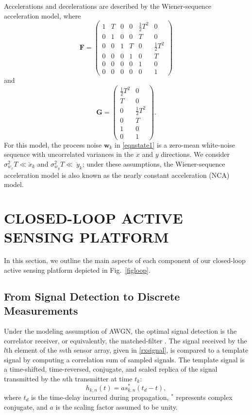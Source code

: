 \documentclass[times]{asjcauth}
\begin{document}
Accelerations and decelerations are described by the Wiener-sequence acceleration model, where
\begin{equation*}
\mathbf{F} = \left(%
\begin{array}{cccccc}
  1 & T & 0 & 0 & \frac{1}{2}T^{2} & 0\\
  0 & 1 & 0 & 0 & T & 0\\
  0 & 0 & 1 & T & 0 & \frac{1}{2}T^{2}\\
  0 & 0 & 0 & 1 & 0 & T\\
  0 & 0 & 0 & 0 & 1 & 0\\
  0 & 0 & 0 & 0 & 0 & 1
\end{array}%
\right)
\end{equation*}
\noindent and
\begin{equation*}
\mathbf{G} = \left(%
\begin{array}{cc}
  \frac{1}{2}T^{2} & 0\\
  T & 0\\
  0 & \frac{1}{2}T^{2}\\
  0 & T\\
  1 & 0\\
  0 & 1
\end{array}%
\right).
\end{equation*}
\noindent For this model, the process noise $\mathbf{w}_{k}$ in \eqref{eqnstate1} is a zero-mean white-noise sequence with uncorrelated variances in the $x$ and $y$ directions. We consider $\sigma^{2}_{w_{x}}T \ll \ddot{x}_{k}$ and $\sigma^{2}_{w_{y}}T \ll~\ddot{y}_{k}$; under these assumptions, the Wiener-sequence acceleration model is also known as the nearly constant acceleration (NCA) model.

\section{CLOSED-LOOP ACTIVE SENSING PLATFORM}
\label{secloop}

In this section, we outline the main aspects of each component of our closed-loop active sensing platform depicted in Fig.~\ref{figloop}.

\subsection{From Signal Detection to Discrete Measurements}\label{secdetection}

Under the modeling assumption of AWGN, the optimal signal detection is the correlator receiver, or equivalently, the matched-filter \cite{Proakis}. The signal received by the $l$th element of the $m$th sensor array, given in \eqref{rxsignal}, is compared to a template signal by computing a correlation sum of sampled signals. The template signal is a time-shifted, time-reversed, conjugate, and scaled replica of the signal transmitted by the $n$th transmitter at time $t_{k}$:
\begin{equation}\label{replica}
h_{k,n}(t) = as_{k,n}^{*}\left(t_{d}-t\right),
\end{equation}
\noindent where $t_{d}$ is the time-delay incurred during propagation, $^{*}$ represents complex conjugate, and $a$ is the scaling factor assumed to be unity.
\end{document}
